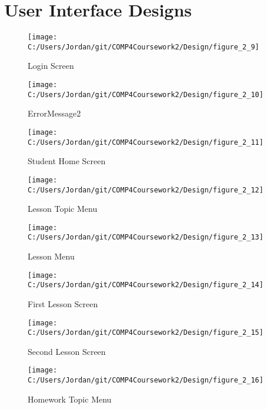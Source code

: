 \section{User Interface Designs}


\begin{figure}[H]
    \label{fig:print_function_result}\caption{Login Screen}
    \texttt{[image: C:/Users/Jordan/git/COMP4Coursework2/Design/figure\_2\_9]}
\end{figure}

\begin{figure}[H]
    \label{fig:print_function_result}\caption{ErrorMessage2}
    \texttt{[image: C:/Users/Jordan/git/COMP4Coursework2/Design/figure\_2\_10]}
\end{figure}

\begin{figure}[H]
    \label{fig:print_function_result}\caption{Student Home Screen}
    \texttt{[image: C:/Users/Jordan/git/COMP4Coursework2/Design/figure\_2\_11]}
\end{figure}

\begin{figure}[H]
    \label{fig:print_function_result}\caption{Lesson Topic Menu}
    \texttt{[image: C:/Users/Jordan/git/COMP4Coursework2/Design/figure\_2\_12]}
\end{figure}

\begin{figure}[H]
    \label{fig:print_function_result}\caption{Lesson Menu}
    \texttt{[image: C:/Users/Jordan/git/COMP4Coursework2/Design/figure\_2\_13]}
\end{figure}

\begin{figure}[H]
    \label{fig:print_function_result}\caption{First Lesson Screen}
    \texttt{[image: C:/Users/Jordan/git/COMP4Coursework2/Design/figure\_2\_14]}
\end{figure}

\begin{figure}[H]
    \label{fig:print_function_result}\caption{Second Lesson Screen}
    \texttt{[image: C:/Users/Jordan/git/COMP4Coursework2/Design/figure\_2\_15]}
\end{figure}

\begin{figure}[H]
    \label{fig:print_function_result}\caption{Homework Topic Menu}
    \texttt{[image: C:/Users/Jordan/git/COMP4Coursework2/Design/figure\_2\_16]}
\end{figure}

